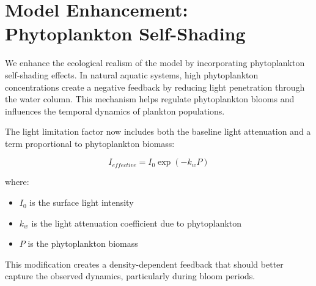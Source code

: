 \section{Model Enhancement: Phytoplankton Self-Shading}

We enhance the ecological realism of the model by incorporating phytoplankton self-shading effects. In natural aquatic systems, high phytoplankton concentrations create a negative feedback by reducing light penetration through the water column. This mechanism helps regulate phytoplankton blooms and influences the temporal dynamics of plankton populations.

The light limitation factor now includes both the baseline light attenuation and a term proportional to phytoplankton biomass:

\[ I_{effective} = I_0 \exp(-k_w P) \]

where:
\begin{itemize}
    \item $I_0$ is the surface light intensity
    \item $k_w$ is the light attenuation coefficient due to phytoplankton
    \item $P$ is the phytoplankton biomass
\end{itemize}

This modification creates a density-dependent feedback that should better capture the observed dynamics, particularly during bloom periods.
